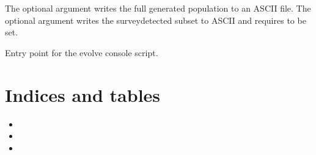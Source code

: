 \documentclass[letterpaper,10pt,english]{sphinxmanual}
\begin{document}
\begin{fulllineitems}
\sphinxAtStartPar
The optional  argument writes the full generated population
to an ASCII file. The optional  argument writes the
survey\sphinxhyphen{}detected subset to ASCII and requires  to be set.

\end{fulllineitems}


\begin{fulllineitems}
\label{\detokenize{module-level-docs:evolve.main}}
\pysigstartsignatures
\pysiglinewithargsret
{}
{}
{}
\pysigstopsignatures
\sphinxAtStartPar
Entry point for the evolve console script.

\end{fulllineitems}



\chapter{Indices and tables}
\label{\detokenize{index:indices-and-tables}}\begin{itemize}
\item {} 
\sphinxAtStartPar
{}

\item {} 
\sphinxAtStartPar
{}

\item {} 
\sphinxAtStartPar
{}

\end{itemize}


\renewcommand{\indexname}{Python Module Index}
\begin{sphinxtheindex}
\let\bigletter\sphinxstyleindexlettergroup
\bigletter{e}
\item\relax{}
\indexspace
\bigletter{g}
\item\relax{}
\indexspace
\bigletter{p}
\item\relax{}
\item\relax{}
\indexspace
\bigletter{r}
\item\relax{}
\indexspace
\bigletter{s}
\item\relax{}
\end{sphinxtheindex}

\renewcommand{\indexname}{Index}
\printindex
\end{document}
